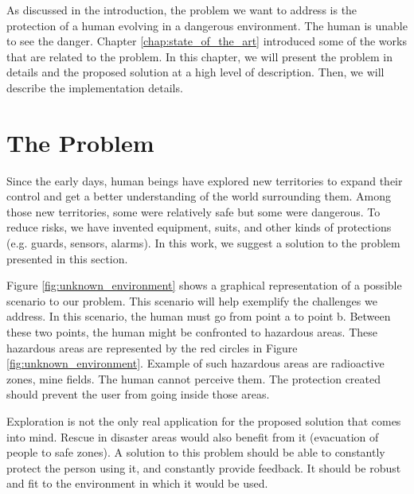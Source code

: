 \documentclass[oneside, a4paper, 12pt]{memoir}
\begin{document}
As discussed in the introduction, the problem we want to address is the protection of a human evolving in a dangerous environment. The human is unable to see the danger. Chapter \ref{chap:state_of_the_art} introduced some of the works that are related to the problem. In this chapter, we will present the problem in details and the proposed solution at a high level of description. Then, we will describe the implementation details.

	\section{The Problem}
		\label{sec:the_problem}

	
	Since the early days, human beings have explored new territories to expand their control and get a better understanding of the world surrounding them. Among those new territories, some were relatively safe but some were dangerous. To reduce risks, we have invented equipment, suits, and other kinds of protections (e.g. guards, sensors, alarms). In this work, we suggest a solution to the problem presented in this section.
	
	Figure \ref{fig:unknown_environment} shows a graphical representation of a possible scenario to our problem. This scenario will help exemplify the challenges we address. In this scenario, the human must go from point a to point b. Between these two points, the human might be confronted to hazardous areas. These hazardous areas are represented by the red circles in Figure \ref{fig:unknown_environment}. Example of such hazardous areas are radioactive zones, mine fields. The human cannot perceive them. The protection created should prevent the user from going inside those areas.
	
	Exploration is not the only real application for the proposed solution that comes into mind. Rescue in disaster areas would also benefit from it (evacuation of people to safe zones). A solution to this problem should be able to constantly protect the person using it, and constantly provide feedback. It should be robust and fit to the environment in which it would be used.
	
\end{document}
